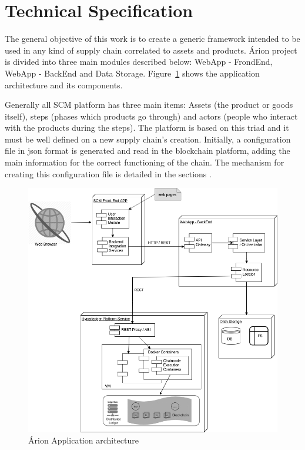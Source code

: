 \section{Technical Specification} \label{sec:Technical}
The general objective of this work is to create a generic framework intended to be used in any kind of supply chain correlated to assets and products. Árion project is divided into three main modules described below: WebApp - FrondEnd, WebApp - BackEnd and Data Storage. Figure~\ref{fig:detalhamentotecnico} shows the application architecture and its components.

Generally all SCM platform has three main items: Assets (the product or goods itself), steps (phases which products go through) and actors (people who interact with the products during the steps). The platform is based on this triad and it must be well defined on a new supply chain's creation. Initially, a configuration file in json format is generated and read in the blockchain platform, adding the main information for the correct functioning of the chain. The mechanism for creating this configuration file is detailed in the sections .

\begin{figure}[ht]
\begin{center}
  \includegraphics[scale=0.4]{images/detalhamentotecnico.png}
\caption{Árion Application architecture}
\label{fig:detalhamentotecnico}
\end{center}
\end{figure}

